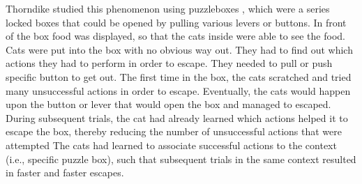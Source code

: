 Thorndike studied this phenomenon using puzzleboxes \citep[pp.8-30]{thorndike1898animal}, which were a series locked boxes that could be opened by pulling various levers or buttons. %
In front of the box food was displayed, so that the cats inside were able to see the food. Cats were put into the box with no obvious way out. They had to find out which actions they had to perform in order to escape. They needed to pull or push specific button to get out.
The first time in the box, the cats scratched and tried many unsuccessful actions in order to escape. Eventually, the cats would happen upon the button or lever that would open the box and managed to escaped. During subsequent trials, the cat had already learned which actions helped it to escape the box, thereby reducing the number of unsuccessful actions that were attempted
The cats had learned to associate successful actions to the context (i.e., specific puzzle box), such that subsequent trials in the same context resulted in faster and faster escapes.

